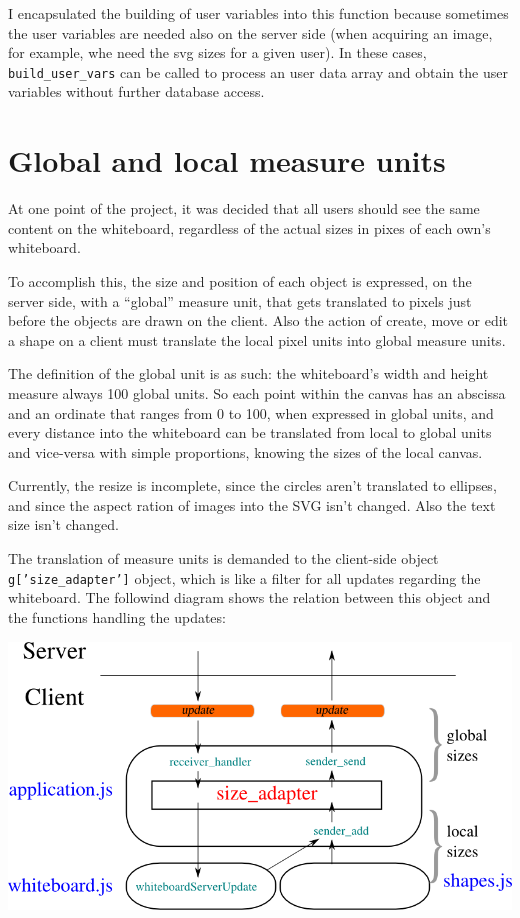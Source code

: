 \documentclass[10pt,a4paper,english]{book}
\begin{document}
I encapsulated the building of user variables into this function
because sometimes the user variables are needed also on the server
side (when acquiring an image, for example, whe need the svg sizes for
a given user). In these cases, \texttt{build{\_}user{\_}vars} can be called to
process an user data array and obtain the user variables without
further database access.



\hypertarget{global-and-local-measure-units}{}
\section{Global and local measure units}
\label{global-and-local-measure-units}

At one point of the project, it was decided that all users should see
the same content on the whiteboard, regardless of the actual sizes in
pixes of each own's whiteboard.

To accomplish this, the size and position of each object is expressed,
on the server side, with a ``global'' measure unit, that gets translated
to pixels just before the objects are drawn on the client. Also the
action of create, move or edit a shape on a client must translate the
local pixel units into global measure units\footnotemark[5].

The definition of the global unit is as such: the whiteboard's width
and height measure always 100 global units. So each point within the
canvas has an abscissa and an ordinate that ranges from 0 to 100,
when expressed in global units, and every distance into the whiteboard
can be translated from local to global units and vice-versa with
simple proportions, knowing the sizes of the local canvas.

Currently, the resize is incomplete, since the circles aren't
translated to ellipses, and since the aspect ration of images into the
SVG isn't changed. Also the text size isn't changed.

The translation of measure units is demanded to the client-side object
\texttt{g{[}'size{\_}adapter'{]}} object, which is like a filter for all updates
regarding the whiteboard. The followind diagram shows the relation
between this object and the functions handling the updates:

\includegraphics{images/size_adapter.png}
\end{document}
